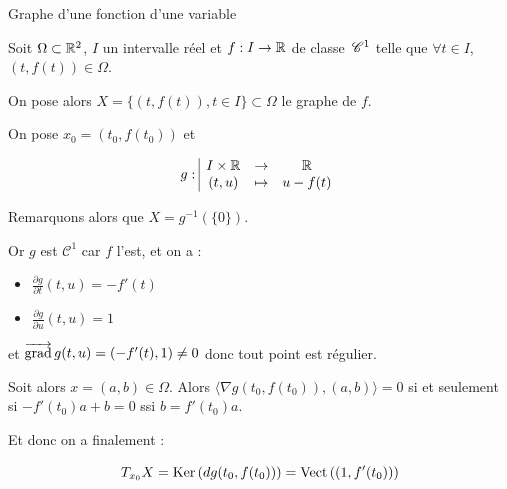 \begin{exemple} 
    Graphe d'une fonction d'une variable 

    Soit $\Omega \subset \mathbb{R}^2$, $I$ un intervalle réel et $f : I \to \mathbb{R}$ de classe 
    $\,\mathscr C^{1}$ telle que {$\forall t \in I$, $(t, f(t)) \in \Omega$.}
    
    On pose alors $X = \{(t, f(t)), t \in I\} \subset \Omega$ le graphe de $f$. 

    On pose $x_0 = (t_0, f(t_0))$ et 
    
    $$g: \space \begin{array}{|ccc} \displaystyle I \times \mathbb{R} & \to & \displaystyle \mathbb{R} \\ \displaystyle (t, u) & \mapsto & \displaystyle u - f(t) \end{array}$$
    
    Remarquons alors que $X = g^{-1}(\{0\})$.


    Or $g$ est $\mathscr C^1$ car $f$ l'est, et on a : 
    \begin{itemize}
        \item $\displaystyle \frac{\partial g}{\partial t}(t, u) = - f'(t)$
        \item $\displaystyle \frac{\partial g}{\partial u}(t, u) = 1$
    \end{itemize}

    et $\overrightarrow{\operatorname{grad}} \, g (t, u) = (- f'(t), 1) \neq 0$ donc tout point est régulier.
    
    Soit alors $x = (a, b) \in \Omega$. Alors $\langle \nabla g(t_0, f(t_0)), (a, b) \rangle = 0$
    si et seulement si $- f'(t_0) a + b = 0$ ssi $b = f'(t_0) a$.

    Et donc on a finalement :
    
    $$T_{x_0}X = \operatorname{Ker} \,(dg(t_0, f(t_0))) = \operatorname{Vect} \,((1, f'(t_0)))$$
\end{exemple}

